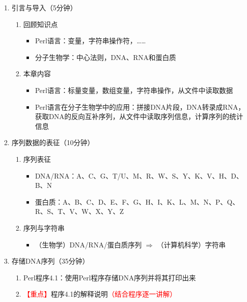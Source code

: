 \documentclass{TIJMUjiaoanLL}
\begin{document}
\firstTail

\newpage
\otherHeader

\begin{enumerate}
  \item 引言与导入（5分钟）
    \begin{enumerate}
      \item 回顾知识点
	\begin{itemize}
	  \item Perl语言：变量，字符串操作符，……
	  \item 分子生物学：中心法则，DNA、RNA和蛋白质
	\end{itemize}
      \item 本章内容
	\begin{itemize}
	  \item Perl语言：标量变量，数组变量，字符串操作，从文件中读取数据
	  \item Perl语言在分子生物学中的应用：拼接DNA片段，DNA转录成RNA，获取DNA的反向互补序列，从文件中读取序列信息，计算序列的统计信息
	\end{itemize}
    \end{enumerate}
  \item 序列数据的表征（10分钟）
    \begin{enumerate}
      \item 序列表征
	\begin{itemize}
	  \item DNA/RNA：A、C、G、T/U、M、R、W、S、Y、K、V、H、D、B、N
	  \item 蛋白质：A、B、C、D、E、F、G、H、I、K、L、M、N、P、Q、R、S、T、V、W、X、Y、Z
	\end{itemize}
      \item 序列与字符串
	\begin{itemize}
	  \item （生物学）DNA/RNA/蛋白质序列 $\Longrightarrow$ （计算机科学）字符串
	\end{itemize}
    \end{enumerate}
  \item 存储DNA序列（35分钟）
    \begin{enumerate}
      \item Perl程序4.1：使用Perl程序存储DNA序列并将其打印出来 
      \item \textcolor{red}{【重点】}程序4.1的解释说明\textcolor{red}{（结合程序逐一讲解）}
\vspace*{-1em}
\begin{multicols}{2}

\end{multicols}
\end{enumerate}
\end{enumerate}
\end{document}
